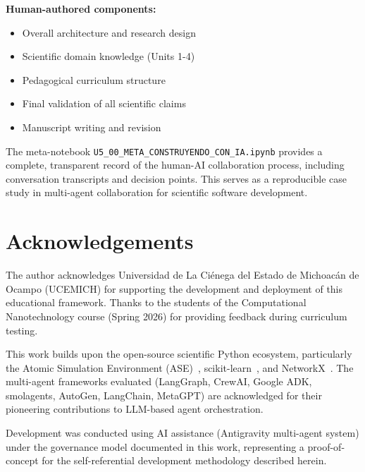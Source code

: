 \documentclass[11pt]{article}
\newcommand{\code}[1]{\texttt{#1}}
\begin{document}
\textbf{Human-authored components:}
\begin{itemize}
    \item Overall architecture and research design
    \item Scientific domain knowledge (Units 1-4)
    \item Pedagogical curriculum structure
    \item Final validation of all scientific claims
    \item Manuscript writing and revision
\end{itemize}

The meta-notebook \code{U5\_00\_META\_CONSTRUYENDO\_CON\_IA.ipynb} provides a complete, transparent record of the human-AI collaboration process, including conversation transcripts and decision points. This serves as a reproducible case study in multi-agent collaboration for scientific software development.

\section{Acknowledgements}

The author acknowledges Universidad de La Ciénega del Estado de Michoacán de Ocampo (UCEMICH) for supporting the development and deployment of this educational framework. Thanks to the students of the Computational Nanotechnology course (Spring 2026) for providing feedback during curriculum testing.

This work builds upon the open-source scientific Python ecosystem, particularly the Atomic Simulation Environment (ASE)~\cite{Larsen2017}, scikit-learn~\cite{Pedregosa2011}, and NetworkX~\cite{NetworkX2008}. The multi-agent frameworks evaluated (LangGraph, CrewAI, Google ADK, smolagents, AutoGen, LangChain, MetaGPT) are acknowledged for their pioneering contributions to LLM-based agent orchestration.

Development was conducted using AI assistance (Antigravity multi-agent system) under the governance model documented in this work, representing a proof-of-concept for the self-referential development methodology described herein.



\end{document}
